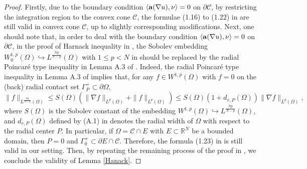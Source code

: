 \documentclass[12pt]{amsart}
\theoremstyle{definition}
\theoremstyle{remark}
\theoremstyle{conclusion}
\theoremstyle{conjecture}
\numberwithin{equation}{section}
\begin{document}
\begin{proof}
Firstly, due to the boundary condition $\left\langle{\bf{a}}(\nabla u),\nu\right\rangle=0$ on $\partial\mathcal{C}$, by restricting the integration region to the convex cone $\mathcal{C}$, the formulae (1.16) to (1.22) in \cite{T2} are still valid in convex cone $\mathcal{C}$, up to slightly corresponding modifications.
Next, one should note that, in order to deal with the boundary condition $\left\langle{\bf{a}}(\nabla u),\nu\right\rangle=0$ on $\partial\mathcal{C}$, in the proof of Harnack inequality in \cite{T2}, the Sobolev embedding $W^{1,p}_{0}(\Omega)\hookrightarrow L^{\frac{Np}{N-p}}(\Omega)$ with $1\leq p<N$ in \cite[Lemma 1.1]{T2}
should be replaced by the radial Poincar\'{e} type inequality in Lemma A.3 of \cite{DGL}. Indeed, the radial Poincar\'{e} type inequality in  Lemma A.3 of \cite{DGL} implies that, for any $f\in W^{1,p}(\Omega)$ with $f=0$ on the (back) radial contact set $\Gamma^{+}_{P}\subset\partial\Omega$,
\begin{equation*}
  \|f\|_{L^{\frac{Np}{N-p}}(\Omega)}\leq S(\Omega)\left(\|\nabla f\|_{L^{p}(\Omega)}+\|f\|_{L^{p}(\Omega)}\right)\leq S(\Omega)\left(1+d_{r,P}(\Omega)\right)\|\nabla f\|_{L^{p}(\Omega)},
\end{equation*}
where $S(\Omega)$ is the Sobolev constant of the embedding $W^{1,p}(\Omega)\hookrightarrow L^{\frac{Np}{N-p}}(\Omega)$, and $d_{r,P}(\Omega)$ defined by (A.1) in \cite{DGL} denotes the radial width of $\Omega$ with respect to the radial center $P$. In particular, if $\Omega=\mathcal{C}\cap E$ with $E\subset\mathbb{R}^{N}$ be a bounded domain, then $P=0$ and $\Gamma^{+}_{0}\subset\partial E\cap\mathcal{C}$.
Therefore, the formula (1.23) in \cite{T2} is still valid in our setting. Then, by repeating the remaining process of the proof in \cite[Theorem 1.2]{T2}, we conclude the validity of Lemma \ref{Hanack}.
\end{proof}
\end{document}
